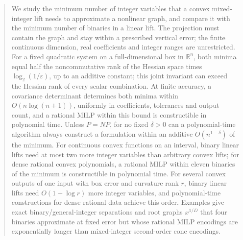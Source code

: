 \begin{abstract}
We study the minimum number of integer variables that a convex
mixed-integer lift needs to approximate a nonlinear graph, and compare
it with the minimum number of binaries in a linear lift. The projection
must contain the graph and stay within a prescribed vertical error;
the finite continuous dimension, real coefficients and integer
ranges are unrestricted. For a fixed quadratic system on a
full-dimensional box in $\mathbb R^n$, both minima equal half the
noncommutative rank of the Hessian space times $\log_2(1/\varepsilon)$,
up to an additive constant; this joint invariant can exceed the Hessian
rank of every scalar combination. At finite accuracy, a
covariance determinant determines both minima within $O(n\log(n+1))$,
uniformly in coefficients, tolerances and output count, and a rational
MILP within this bound is constructible in polynomial time. Unless
$P=NP$, for no fixed $\delta>0$ can a polynomial-time algorithm always
construct a formulation within an additive $O(n^{1-\delta})$ of the
minimum. For continuous convex functions on an interval, binary linear
lifts need at most two more integer variables than arbitrary convex
lifts; for dense rational convex polynomials, a rational MILP within
eleven binaries of the minimum is constructible in polynomial time. For
several convex outputs of one input with box error and curvature rank
$r$, binary linear lifts need $O(1+\log r)$ more integer variables, and
polynomial-time constructions for dense rational data achieve this
order. Examples give exact binary/general-integer separations and root
graphs $x^{1/D}$ that four binaries approximate at fixed error but whose
rational MILP encodings are exponentially longer than mixed-integer
second-order cone encodings.
\end{abstract}
